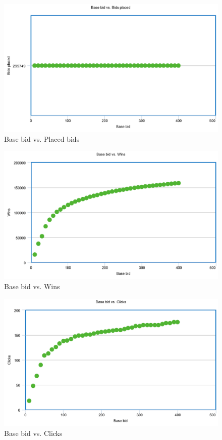 \documentclass{sig-alternate-05-2015}
\begin{document}
\begin{figure}
  \includegraphics[width=\linewidth]{linear_bids.png}
  \caption{Base bid vs. Placed bids}
  \label{fig:bids}
\end{figure}

\begin{figure}
  \includegraphics[width=\linewidth]{linear_wins.png}
  \caption{Base bid vs. Wins}
  \label{fig:bids}
\end{figure}

\begin{figure}
  \includegraphics[width=\linewidth]{linear_clicks.png}
  \caption{Base bid vs. Clicks}
  \label{fig:bids}
\end{figure}
\end{document}
